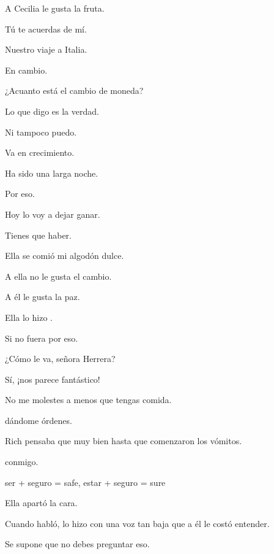 \bigskip
A Cecilia le gusta la fruta.

\sk
Tú te acuerdas de mí.

\sk
Nuestro viaje a Italia.

\sk
En cambio. 

\sk
¿Acuanto está el cambio de moneda?

\sk
Lo que digo es la verdad.

\sk
Ni tampoco puedo. 

\sk
Va en crecimiento. 

\sk
Ha sido una larga noche.

\sk
Por eso. 

\sk
Hoy lo voy a dejar ganar.

\sk
Tienes que haber. 

\sk
Ella se comió mi algodón dulce. 

\sk
A ella no le gusta el cambio.

\sk
A él le gusta la paz.

\sk
Ella lo hizo . 

\sk
Si no fuera por eso. 

\sk
¿Cómo le va, señora Herrera?

\sk
Sí, ¡nos parece fantástico! 

\sk
No me molestes a menos que tengas comida. 

\sk
{} dándome órdenes. 

\sk
Rich pensaba que  muy bien hasta que comenzaron los vómitos. 

\sk
{} conmigo. 

\sk
ser + seguro = safe, estar + seguro = sure

\sk
Ella apartó la cara. 

\sk
Cuando habló, lo hizo con una voz tan baja que a él le costó entender. 

\sk
Se supone que no debes preguntar eso. 

